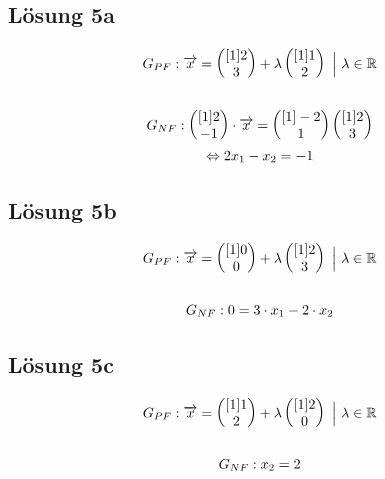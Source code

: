 \subsection{Lösung 5a}
\begin{gather*}
	G_{PF} :\vec{x}=\begin{pmatrix}[1]
		2\\
		3
	\end{pmatrix} +\lambda \begin{pmatrix}[1]
		1\\
		2
	\end{pmatrix} \ \Bigl| \ \lambda \in \mathbb{R}\\
	\\
	G_{NF} : \begin{pmatrix}[1]
		2\\
		-1
	\end{pmatrix} \cdot \vec{x} = \begin{pmatrix}[1]
		-2\\
		1
	\end{pmatrix}\begin{pmatrix}[1]
		2\\
		3
	\end{pmatrix}\\
	\Leftrightarrow 2 x_1 - x_2 = -1
\end{gather*}

\subsection{Lösung 5b}
\begin{gather*}
	G_{PF} :\vec{x}=\begin{pmatrix}[1]
		0\\
		0
	\end{pmatrix} +\lambda \begin{pmatrix}[1]
		2\\
		3
	\end{pmatrix} \ \Bigl| \ \lambda \in \mathbb{R}\\
	\\
	G_{NF} : 0 = 3 \cdot x_1 - 2 \cdot x_2
\end{gather*}

\subsection{Lösung 5c}
\begin{gather*}
	G_{PF} :\vec{x}=\begin{pmatrix}[1]
		1\\
		2
	\end{pmatrix} +\lambda \begin{pmatrix}[1]
		2\\
		0
	\end{pmatrix} \ \Bigl| \ \lambda \in \mathbb{R}\\
	\\
	G_{NF} : x_2 = 2
\end{gather*}